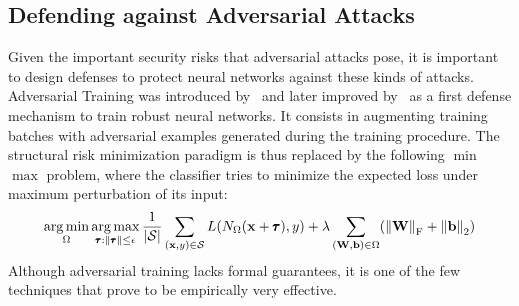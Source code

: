 \subsection{Defending against Adversarial Attacks}
\label{subsection:ch2-defending_against_adversarial_attacks}

Given the important security risks that adversarial attacks pose, it is important to design defenses to protect neural networks against these kinds of attacks.
Adversarial Training was introduced by~\citet{goodfellow2014explaining} and later improved by~\citet{madry2018towards} as a first defense mechanism to train robust neural networks.
It consists in augmenting training batches with adversarial examples generated during the training procedure.
The structural risk minimization paradigm is thus replaced by the following $\min$ $\max$ problem, where the classifier tries to minimize the expected loss under maximum perturbation of its input:
\begin{equation}
  \argmin_\weights \argmax_{\adv: \norm{\adv} \leq \epsilon} \frac{1}{|\mathcal{S}|} \sum_{(\xvec, y) \in \mathcal{S}} L\left( \nn_\weights \left(\xvec + \adv \right), y \right) + \lambda \sum_{(\Wmat, \bvec) \in \weights} \left( \norm{\Wmat}_\mathrm{F} + \norm{\bvec}_\mathrm{2} \right)
\end{equation}
Although adversarial training lacks formal guarantees, it is one of the few techniques that prove to be empirically very effective.






%
%
%




